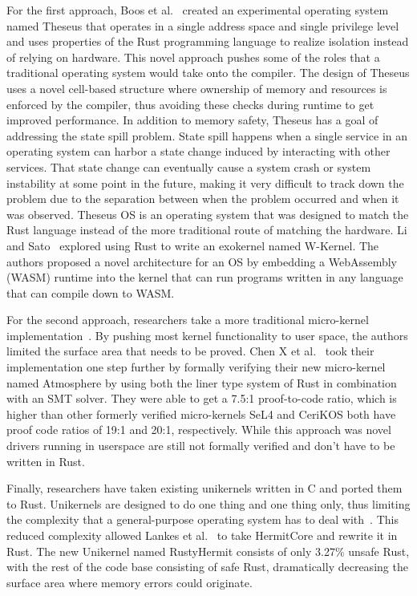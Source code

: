 \documentclass[sigconf]{acmart}
\begin{document}
For the first approach, Boos et al.~\cite{Boos2020-zh} created an experimental operating system
named Theseus that operates in a single address space and single privilege level and uses properties
of the Rust programming language to realize isolation instead of relying on hardware. This novel
approach pushes some of the roles that a traditional operating system would take onto the
compiler. The design of Theseus uses a novel cell-based structure where ownership of memory and
resources is enforced by the compiler, thus avoiding these checks during runtime to get improved
performance. In addition to memory safety, Theseus has a goal of addressing the state spill
problem. State spill happens when a single service in an operating system can harbor a state change
induced by interacting with other services. That state change can eventually cause a system crash or
system instability at some point in the future, making it very difficult to track down the problem
due to the separation between when the problem occurred and when it was observed. Theseus OS is an
operating system that was designed to match the Rust language instead of the more traditional route
of matching the hardware. Li and Sato~\cite{Li2024-yb} explored using Rust to write an exokernel named W-Kernel. The authors proposed a novel architecture for an OS by embedding a WebAssembly (WASM) runtime into the kernel that can run programs written in any language that can compile down to WASM.

For the second approach, researchers take a more traditional micro-kernel implementation~\cite{Chen2023-wb, Liang2021-bo}. By pushing most kernel functionality
to user space, the authors limited the surface area that needs to be proved. Chen X et al.~\cite{Chen2023-wb} took
their implementation one step further by formally verifying their new micro-kernel named Atmosphere
by using both the liner type system of Rust in combination with an SMT solver. They were
able to get a 7.5:1 proof-to-code ratio, which is higher than other formerly verified micro-kernels
SeL4 and CeriKOS both have proof code ratios of 19:1 and 20:1, respectively. While this
approach was novel drivers running in userspace are still not formally verified and don't have to be
written in Rust.

Finally, researchers have taken existing unikernels written in C and ported them to Rust. Unikernels are designed to do one thing
and one thing only, thus limiting the complexity that a general-purpose operating system has to
deal with~\cite{Madhavapeddy2014-zw}. This reduced complexity allowed  Lankes et al.~\cite{Lankes2019-cm} to take HermitCore and rewrite it in Rust. The new
Unikernel named RustyHermit consists of only 3.27\% unsafe Rust, with the rest of the code base consisting of safe Rust, dramatically decreasing the surface area where memory errors could originate.
\end{document}
